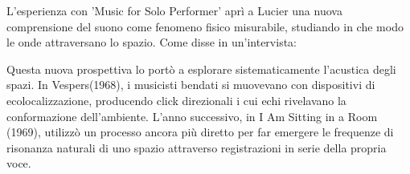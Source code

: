L'esperienza con 'Music for Solo Performer' aprì a Lucier una nuova comprensione del suono come fenomeno fisico misurabile, studiando in che modo le onde attraversano lo spazio. Come disse in un'intervista:


Questa nuova prospettiva lo portò a esplorare sistematicamente l'acustica degli spazi. In Vespers(1968), i musicisti bendati si muovevano con dispositivi di ecolocalizzazione, producendo click direzionali i cui echi rivelavano la conformazione dell'ambiente. L'anno successivo, in I Am Sitting in a Room (1969), utilizzò un processo ancora più diretto per far emergere le frequenze di risonanza naturali di uno spazio attraverso registrazioni in serie della propria voce.